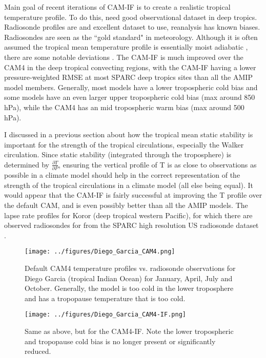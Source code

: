 \documentclass[letterpaper,12pt,titlepage,oneside,final]{book}
\begin{document}
Main goal of recent iterations of CAM-IF is to create a realistic tropical temperature profile. To do this, need good observational dataset in deep tropics. Radiosonde profiles are and excellent dataset to use, reanalysis has known biases. Radiosondes are seen as the ``gold standard" in meteorology. Although it is often assumed the tropical mean temperature profile is essentially moist adiabatic \cite{emanuel_quasi-equilibrium_2007}, there are some notable deviations \cite{folkins_melting_2013}. The CAM-IF is much improved over the CAM4 in the deep tropical convecting regions, with the CAM-IF having a lower pressure-weighted RMSE at most SPARC deep tropics sites than all the AMIP model members. Generally, most models have a lower tropospheric cold bias and some models have an even larger upper tropospheric cold bias (max around 850 hPa), while the CAM4 has an mid tropospheric warm bias (max around 500 hPa). 

I discussed in a previous section about how the tropical mean static stability is important for the strength of the tropical circulations, especially the Walker circulation. Since static stability (integrated through the troposphere) is determined by $\frac{\partial{T}}{\partial{P}}$, ensuring the vertical profile of T is as close to observations as possible in a climate model should help in the correct representation of the strength of the tropical circulations in a climate model (all else being equal). It would appear that the CAM-IF is fairly successful at improving the T profile over the default CAM, and is even possibly better than all the AMIP models. The lapse rate profiles for Koror (deep tropical western Pacific), for which there are observed radiosondes for from the SPARC high resolution US radiosonde dataset \cite{love_us_nodate}. 

\begin{figure}[H]
\centering
\noindent\texttt{[image: ../figures/Diego\_Garcia\_CAM4.png]}\hfill
\caption{Default CAM4 temperature profiles vs. radiosonde observations for Diego Garcia (tropical Indian Ocean) for January, April, July and October. Generally, the model is too cold in the lower troposphere and has a tropopause temperature that is too cold.}%
\label{fig:1figs}%
\end{figure}

\begin{figure}[H]
\centering
\noindent\texttt{[image: ../figures/Diego\_Garcia\_CAM4-IF.png]}\hfill
\caption{Same as above, but for the CAM4-IF. Note the lower tropospheric and tropopause cold bias is no longer present or significantly reduced.}%
\label{fig:1figs}%
\end{figure}
\end{document}
